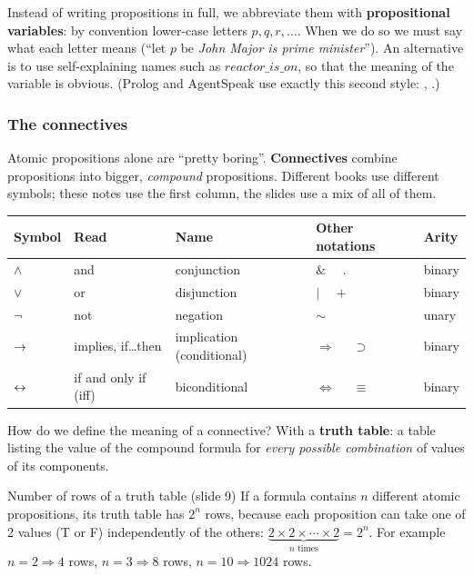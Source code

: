 Instead of writing propositions in full, we abbreviate them with \textbf{propositional
variables}: by convention lower-case letters $p, q, r, \ldots$. When we do so we must say
what each letter means (``let $p$ be \emph{John Major is prime minister}''). An
alternative is to use self-explaining names such as $\mathit{reactor\_is\_on}$, so that the
meaning of the variable is obvious. (Prolog and AgentSpeak use exactly this second style:
, .)

\subsubsection{The connectives}

Atomic propositions alone are ``pretty boring''. \textbf{Connectives} combine propositions
into bigger, \emph{compound} propositions. Different books use different symbols; these
notes use the first column, the slides use a mix of all of them.

\begin{center}
\small
\begin{tabular}{@{}lllll@{}}
\toprule
\textbf{Symbol} & \textbf{Read} & \textbf{Name} & \textbf{Other notations} & \textbf{Arity} \\
\midrule
$\land$ & and & conjunction & $\&$ \ \ $.$ & binary \\
$\lor$ & or & disjunction & $|$ \ \ $+$ & binary \\
$\neg$ & not & negation & $\sim$ & unary \\
$\rightarrow$ & implies, if\ldots then & implication (conditional) & $\Rightarrow$ \ \ $\supset$ & binary \\
$\leftrightarrow$ & if and only if (iff) & biconditional & $\Leftrightarrow$ \ \ $\equiv$ & binary \\
\bottomrule
\end{tabular}
\end{center}

How do we define the meaning of a connective? With a \textbf{truth table}: a table listing
the value of the compound formula for \emph{every possible combination} of values of its
components.

\begin{nbfact}{Number of rows of a truth table (slide 9)}
If a formula contains $n$ different atomic propositions, its truth table has $2^n$ rows,
because each proposition can take one of 2 values (T or F) independently of the others:
$\underbrace{2 \times 2 \times \cdots \times 2}_{n \text{ times}} = 2^n$.
For example $n = 2 \Rightarrow 4$ rows, $n = 3 \Rightarrow 8$ rows, $n = 10 \Rightarrow 1024$ rows.
\end{nbfact}

